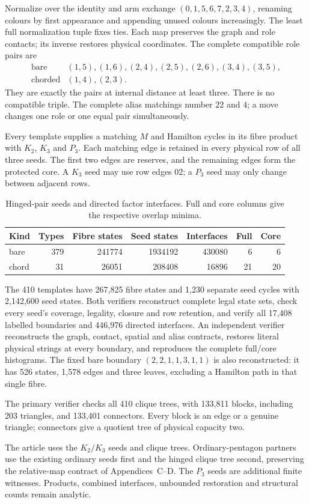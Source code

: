 Normalize over the identity and arm exchange $(0,1,5,6,7,2,3,4)$,
renaming colours by first appearance and appending unused colours
increasingly. The least full normalization tuple fixes ties. Each map
preserves the graph and role contacts; its inverse restores physical
coordinates. The complete compatible role pairs are
\[
\begin{array}{cl}
\text{bare}&(1,5),(1,6),(2,4),(2,5),(2,6),(3,4),(3,5),\\
\text{chorded}&(1,4),(2,3).
\end{array}
\]
They are exactly the pairs at internal distance at least three. There
is no compatible triple. The complete alias matchings number $22$ and
$4$; a move changes one role or one equal pair simultaneously.

Every template supplies a matching $M$ and Hamilton cycles in its fibre
product with $K_2$, $K_3$ and $P_3$. Each matching edge is retained in
every physical row of all three seeds. The first two edges are reserves,
and the remaining edges form the protected core. A $K_3$ seed may use
row edges $02$; a $P_3$ seed may only change between adjacent rows.

\begin{table}[htbp]
\centering\small
\caption{Hinged-pair seeds and directed factor interfaces.
Full and core columns give the respective overlap minima.}
\label{tab:hinged-pair-counts}
\begin{tabular}{lrrrrrr}
\toprule
Kind & Types & Fibre states & Seed states & Interfaces & Full & Core\\
\midrule
bare&379&241774&1934192&430080&6&6\\
chord&31&26051&208408&16896&21&20\\
\bottomrule
\end{tabular}
\end{table}

The 410 templates have 267,825 fibre states and 1,230 separate seed
cycles with 2,142,600 seed states. Both verifiers reconstruct complete
legal state sets, check every seed's coverage, legality, closure and
row retention, and verify all 17,408 labelled boundaries and 446,976
directed interfaces. An independent verifier reconstructs the graph,
contact, spatial and alias contracts, restores literal physical strings at
every boundary, and reproduces the complete full/core histograms.
The fixed bare boundary $(2,2,1,1,3,1,1)$ is also reconstructed: it has
526 states, 1,578 edges and three leaves, excluding a Hamilton path
in that single fibre.

The primary verifier checks all 410 clique trees, with 133,811 blocks,
including 203 triangles, and 133,401 connectors. Every block is an edge
or a genuine triangle; connectors give a quotient tree of physical
capacity two.

The article uses the $K_2/K_3$ seeds and clique trees. Ordinary-pentagon
partners use the existing ordinary seeds first and the hinged clique
tree second, preserving the relative-map contract of Appendices~C--D.
The $P_3$ seeds are additional finite witnesses. Products, combined
interfaces, unbounded restoration and structural counts remain analytic.
